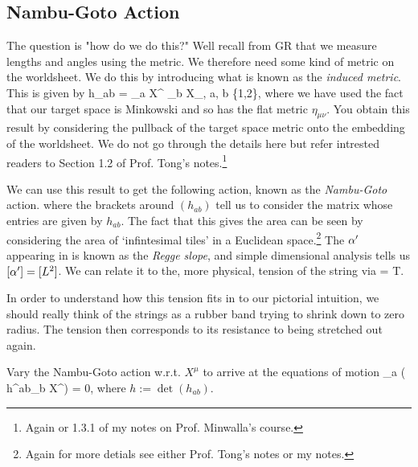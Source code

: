 \subsection{Nambu-Goto Action}

The question is "how do we do this?" Well recall from GR that we measure lengths and angles using the metric. We therefore need some kind of metric on the worldsheet. We do this by introducing what is known as the \textit{induced metric}. This is given by
\be 
\label{eqn:InducedMetric}
    h_{ab} = \p_a X^{\mu} \p_b X_{\mu}, \qquad a, b \in \{1,2\},
\ee 
where we have used the fact that our target space is Minkowski and so has the flat metric $\eta_{\mu\nu}$. You obtain this result by considering the pullback of the target space metric onto the embedding of the worldsheet. We do not go through the details here but refer intrested readers to Section 1.2 of Prof. Tong's notes.\footnote{Again or 1.3.1 of my notes on Prof. Minwalla's course.} 

We can use this result to get the following action, known as the \textit{Nambu-Goto} action.
\noindent where the brackets around $(h_{ab})$ tell us to consider the matrix whose entries are given by $h_{ab}$. The fact that this gives the area can be seen by considering the area of `infintesimal tiles' in a Euclidean space.\footnote{Again for more detials see either Prof. Tong's notes or my notes.} The $\alpha^{\prime}$ appearing in  is known as the \textit{Regge slope}, and simple dimensional analysis tells us $[\alpha^{\prime}] = [L^2]$. We can  relate it to the, more physical, tension of the string via
\bse 
     = T.
\ese

\br 
    In order to understand how this tension fits in to our pictorial intuition, we should really think of the strings as a rubber band trying to shrink down to zero radius. The tension then corresponds to its resistance to being stretched out again.
\er 

\bbox 
    Vary the Nambu-Goto action w.r.t. $X^{\mu}$ to arrive at the equations of motion 
    \be 
    \label{eqn:NambuGotoEOM}
        \p_a \big(  h^{ab}\p_b X^{\mu}\big) = 0,
    \ee 
    where $h:=\det(h_{ab})$.
\ebox 

